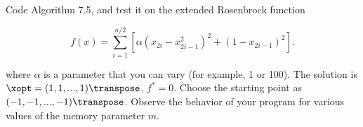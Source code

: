 \begin{problem}\label{prob:03}%
  Code Algorithm 7.5, and test it on the extended Rosenbrock function
  
  \[ f(x) = \sum_{i=1}^{n/2} \left[ \alpha(x_{2i} - x^2_{2i-1})^2 + (1-x_{2i-1})^2 \right] \text{.} \]
  
  where $\alpha$ is a parameter that you can vary (for example, 1 or 100). The solution is $\xopt=(1,1,...,1)\transpose$, $f^{*}=0$. Choose the starting point as $(-1,-1,...,-1)\transpose$. Observe the behavior of your program for various values of the memory parameter $m$.
\end{problem}


